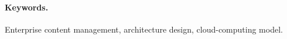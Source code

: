 \documentclass[EPiC]{easychair} %
\begin{document}
  \paragraph{Keywords.} Enterprise content management, architecture design, cloud-computing model.

%
%
\end{document}
